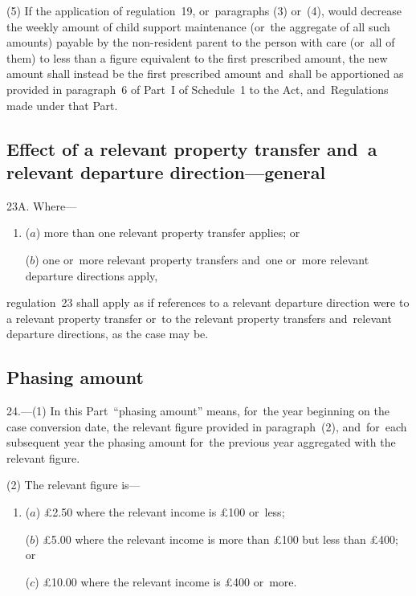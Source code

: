 \documentclass[12pt,a4paper]{article}
\begin{document}
(5) If the application of regulation~19, or~paragraphs (3) or~(4), would decrease the weekly amount of child support maintenance (or~the aggregate of all such amounts) payable by the non-resident parent to the person with care (or~all of them) to less than a figure equivalent to the first prescribed amount, the new amount shall instead be the first prescribed amount and~shall be apportioned as provided in paragraph~6 of Part~I of Schedule~1 to the Act, and~Regulations made under that Part.


\subsection[23A. Effect of a relevant property transfer and~a relevant departure direction—general]{Effect of a relevant property transfer and~a relevant departure direction—general}

23A.  Where—
\begin{enumerate}\item[]
($a$) more than one relevant property transfer applies; or

($b$) one or~more relevant property transfers and~one or~more relevant departure directions apply,
\end{enumerate}
regulation~23 shall apply as if references to a relevant departure direction were to a relevant property transfer or~to the relevant property transfers and~relevant departure directions, as the case may be.


\subsection[24. Phasing amount]{Phasing amount}

24.---(1)  In this Part~“phasing amount” means, for~the year beginning on the case conversion date, the relevant figure provided in paragraph~(2), and~for~each subsequent year the phasing amount for~the previous year aggregated with the relevant figure.

(2) The relevant figure is—
\begin{enumerate}\item[]
($a$) £2$.$50 where the relevant income is £100 or~less;

($b$) £5$.$00 where the relevant income is more than £100 but less than £400; or

($c$) £10$.$00 where the relevant income is £400 or~more.
\end{enumerate}
\end{document}
